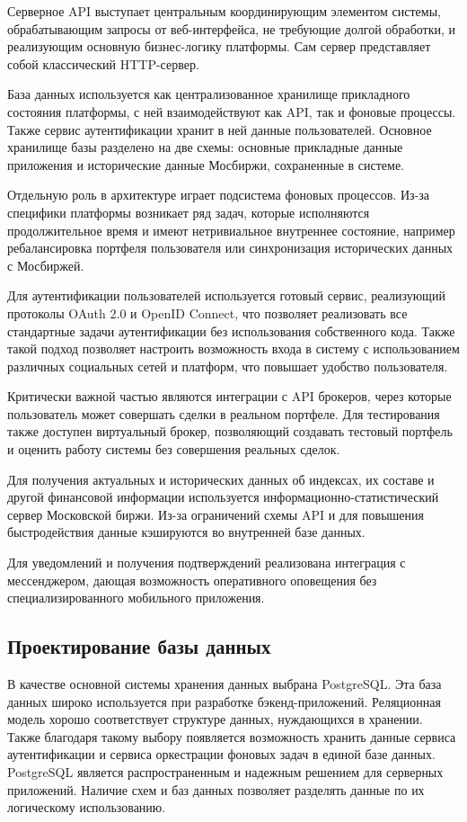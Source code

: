 \documentclass[14pt]{gost-7-32}
\begin{document}
Серверное API выступает центральным координирующим элементом системы, обрабатывающим запросы от веб-интерфейса, не требующие долгой обработки, и реализующим основную бизнес-логику платформы. Сам сервер представляет собой классический HTTP-сервер.

База данных используется как централизованное хранилище прикладного состояния платформы, с ней взаимодействуют как API, так и фоновые процессы. Также сервис аутентификации хранит в ней данные пользователей. Основное хранилище базы разделено на две схемы: основные прикладные данные приложения и исторические данные Мосбиржи, сохраненные в системе.

Отдельную роль в архитектуре играет подсистема фоновых процессов. Из-за специфики платформы возникает ряд задач, которые исполняются продолжительное время и имеют нетривиальное внутреннее состояние, например ребалансировка портфеля пользователя или синхронизация исторических данных с Мосбиржей.

Для аутентификации пользователей используется готовый сервис, реализующий протоколы OAuth 2.0 и OpenID Connect, что позволяет реализовать все стандартные задачи аутентификации без использования собственного кода. Также такой подход позволяет настроить возможность входа в систему с использованием различных социальных сетей и платформ, что повышает удобство пользователя.

Критически важной частью являются интеграции с API брокеров, через которые пользователь может совершать сделки в реальном портфеле. Для тестирования также доступен виртуальный брокер, позволяющий создавать тестовый портфель и оценить работу системы без совершения реальных сделок.

Для получения актуальных и исторических данных об индексах, их составе и другой финансовой информации используется информационно-статистический сервер Московской биржи. Из-за ограничений схемы API и для повышения быстродействия данные кэшируются во внутренней базе данных.

Для уведомлений и получения подтверждений реализована интеграция с мессенджером, дающая возможность оперативного оповещения без специализированного мобильного приложения.

\subsection{Проектирование базы данных}

В качестве основной системы хранения данных выбрана PostgreSQL. Эта база данных широко используется при разработке бэкенд-приложений. Реляционная модель хорошо соответствует структуре данных, нуждающихся в хранении. Также благодаря такому выбору появляется возможность хранить данные сервиса аутентификации и сервиса оркестрации фоновых задач в единой базе данных. PostgreSQL является распространенным и надежным решением для серверных приложений. Наличие схем и баз данных позволяет разделять данные по их логическому использованию.
\end{document}
